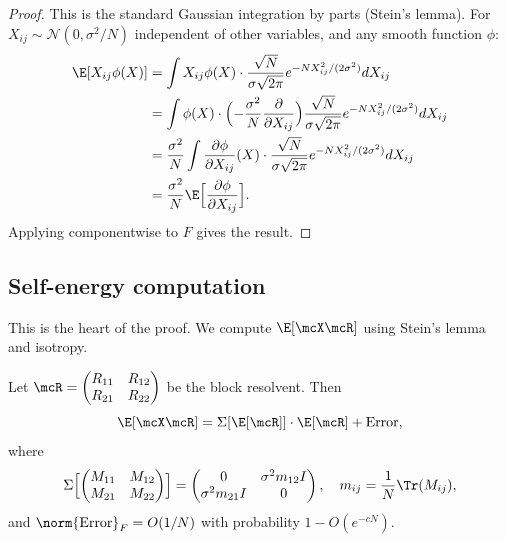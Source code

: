 \begin{proof}
This is the standard Gaussian integration by parts (Stein's lemma). For $X_{ij} \sim \mathcal{N}(0, \sigma^2/N)$ independent of other variables, and any smooth function $\phi$:
\begin{align}
\E[X_{ij} \phi(X)]
&= \int X_{ij} \phi(X) \cdot \frac{\sqrt{N}}{\sigma\sqrt{2\pi}} e^{-N X_{ij}^2/(2\sigma^2)} dX_{ij} \\
&= \int \phi(X) \cdot \Bigl(-\frac{\sigma^2}{N} \frac{\partial}{\partial X_{ij}}\Bigr) \frac{\sqrt{N}}{\sigma\sqrt{2\pi}} e^{-NX_{ij}^2/(2\sigma^2)} dX_{ij} \\
&= \frac{\sigma^2}{N} \int \frac{\partial \phi}{\partial X_{ij}}(X) \cdot \frac{\sqrt{N}}{\sigma\sqrt{2\pi}} e^{-NX_{ij}^2/(2\sigma^2)} dX_{ij} \\
&= \frac{\sigma^2}{N} \E\Bigl[\frac{\partial \phi}{\partial X_{ij}}\Bigr].
\end{align}
Applying componentwise to $F$ gives the result.
\end{proof}

\subsection{Self-energy computation}

This is the heart of the proof. We compute $\E[\mcX \mcR]$ using Stein's lemma and isotropy.

\begin{proposition}\label{prop:self-energy}
Let $\mcR = \begin{pmatrix} R_{11} & R_{12} \\ R_{21} & R_{22} \end{pmatrix}$ be the block resolvent. Then
\begin{equation}\label{eq:self-energy-formula}
\E[\mcX \mcR] = \Sigma[\E[\mcR]] \cdot \E[\mcR] + \text{Error},
\end{equation}
where
\begin{equation}
\Sigma\Bigl[\begin{pmatrix} M_{11} & M_{12} \\ M_{21} & M_{22} \end{pmatrix}\Bigr]
= \begin{pmatrix} 0 & \sigma^2 m_{12} I \\ \sigma^2 m_{21} I & 0 \end{pmatrix},
\quad
m_{ij} = \frac{1}{N}\Tr(M_{ij}),
\end{equation}
and $\norm{\text{Error}}_F = O(1/N)$ with probability $1 - O(e^{-cN})$.
\end{proposition}


